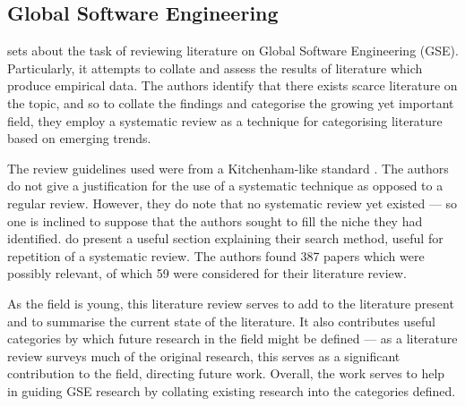 \subsection{Global Software Engineering}
\citet*{Smite2010} sets about the task of reviewing literature on Global Software Engineering (GSE). Particularly, it attempts to collate and assess the results of literature which produce empirical data. The authors identify that there exists scarce literature on the topic, and so to collate the findings and categorise the growing yet important field, they employ a systematic review as a technique for categorising literature based on emerging trends.\par

The review guidelines used were from a Kitchenham-like standard \citep{Kitchenham2007}. The authors do not give a justification for the use of a systematic technique as opposed to a regular review. However, they do note that no systematic review yet existed --- so one is inclined to suppose that the authors sought to fill the niche they had identified. \citeauthor{Smite2010} do present a useful section explaining their search method, useful for repetition of a systematic review. The authors found 387 papers which were possibly relevant, of which 59 were considered for their literature review.\par

As the field is young, this literature review serves to add to the literature present and to summarise the current state of the literature. It also contributes useful categories by which future research in the field might be defined --- as a literature review surveys much of the original research, this serves as a significant contribution to the field, directing future work. Overall, the work serves to help in guiding GSE research by collating existing research into the categories defined.\par


